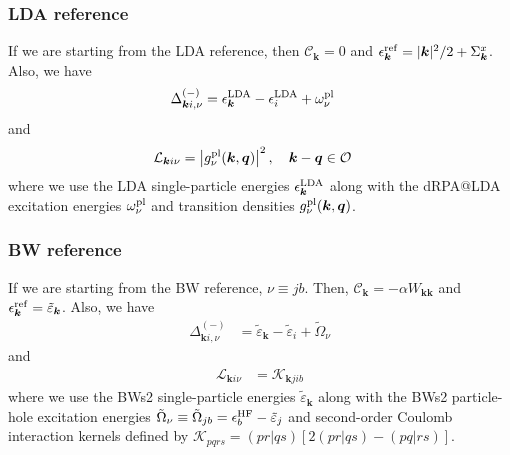 \subsubsection{LDA reference}
 If we are starting from the LDA reference, then $\mathcal{C}_{\bm{k}}=0$ and $\epsilon_{\bm{k}}^{\rm ref}=|\bm{k}|^2/2 + \Sigma_{\bm{k}}^x$. Also, we have
\begin{align}
\Delta_{\bm{k}i,\nu}^{(-)}
&=
\epsilon_{\bm{k}}^{\rm LDA}
-\epsilon_i^{\rm LDA}
+
\omega_{\nu}^{\rm pl}
\end{align}
and
\begin{align}
\mathcal{L}_{\bm{k}i\nu}
&=
\left|g_\nu^{\rm pl}(\bm{k},\bm{q})\right|^2, \quad \bm{k}-\bm{q}\in\mathcal{O}
\end{align}
where we use the LDA single-particle energies $\epsilon_{\bm{k}}^{\rm LDA}$ along with the dRPA@LDA excitation energies $\omega_{\nu}^{\rm pl}$ and transition densities $g_\nu^{\rm pl}(\bm{k},\bm{q})$.
\subsubsection{BW reference}
 If we are starting from the BW reference, $\nu\equiv jb$. Then, $\mathcal{C}_{\bm{k}}=-\alpha W_{\bm{k}\bm{k}}$ and $\epsilon_{\bm{k}}^{\rm ref}=\tilde{\varepsilon}_{\bm{k}}$. Also,
we have
\begin{align}
\Delta_{\bm{k}i,\nu}^{(-)}
&=
\tilde{\varepsilon}_{\bm{k}}
-\tilde{\varepsilon}_i
+
\tilde{\Omega}_{\nu}
\end{align}
and
\begin{align}
\mathcal{L}_{\bm{k}i\nu}
&=
\mathcal{K}_{\bm{k}jib}
\end{align}
where we use the BWs2 single-particle energies $\tilde{\varepsilon}_{\bm{k}}$ along with the BWs2 particle-hole excitation energies $\tilde{\Omega}_{\nu}\equiv \tilde{\Omega}_{jb}=\epsilon_b^{\rm HF}-\tilde{\varepsilon}_j$ and second-order Coulomb interaction kernels defined by $\mathcal K_{pqrs}=
(pr|qs)
\left[
2(pr|qs)-(pq|rs)
\right]$.
